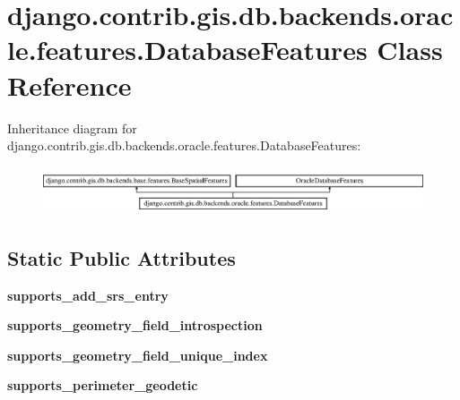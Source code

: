 \hypertarget{classdjango_1_1contrib_1_1gis_1_1db_1_1backends_1_1oracle_1_1features_1_1_database_features}{}\section{django.\+contrib.\+gis.\+db.\+backends.\+oracle.\+features.\+Database\+Features Class Reference}
\label{classdjango_1_1contrib_1_1gis_1_1db_1_1backends_1_1oracle_1_1features_1_1_database_features}
Inheritance diagram for django.\+contrib.\+gis.\+db.\+backends.\+oracle.\+features.\+Database\+Features\+:\begin{figure}[H]
\begin{center}
\leavevmode
\includegraphics[height=1.407035cm]{classdjango_1_1contrib_1_1gis_1_1db_1_1backends_1_1oracle_1_1features_1_1_database_features}
\end{center}
\end{figure}
\subsection*{Static Public Attributes}
\begin{DoxyCompactItemize}
\item 
\mbox{\label{classdjango_1_1contrib_1_1gis_1_1db_1_1backends_1_1oracle_1_1features_1_1_database_features_a66b1b2082f40cbcc41bda08b0ad769f5}} 
{\bfseries supports\+\_\+add\+\_\+srs\+\_\+entry}
\item 
\mbox{\label{classdjango_1_1contrib_1_1gis_1_1db_1_1backends_1_1oracle_1_1features_1_1_database_features_a13236470623adcbd230a2e9b7ba1bcd7}} 
{\bfseries supports\+\_\+geometry\+\_\+field\+\_\+introspection}
\item 
\mbox{\label{classdjango_1_1contrib_1_1gis_1_1db_1_1backends_1_1oracle_1_1features_1_1_database_features_a712894836deda760c0991405aaf670c4}} 
{\bfseries supports\+\_\+geometry\+\_\+field\+\_\+unique\+\_\+index}
\item 
\mbox{\label{classdjango_1_1contrib_1_1gis_1_1db_1_1backends_1_1oracle_1_1features_1_1_database_features_aaec8277bc3cd3e221399f610ac23442b}} 
{\bfseries supports\+\_\+perimeter\+\_\+geodetic}
\end{DoxyCompactItemize}

